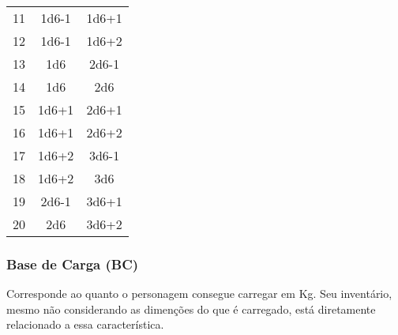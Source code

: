 \documentclass[a4paper]{article}
\begin{document}
\begin{table}[h]
{\begin{tabular}{ l l l }
    \multicolumn{1}{|c|}{11 \centering } &
    \multicolumn{1}{c|}{1d6-1 \centering } &
    \multicolumn{1}{c|}{1d6+1 \centering }
  \\  
  \cline{1-1}\cline{2-2}\cline{3-3}  
    \multicolumn{1}{|c|}{12 \centering } &
    \multicolumn{1}{c|}{1d6-1 \centering } &
    \multicolumn{1}{c|}{1d6+2 \centering }
  \\  
  \cline{1-1}\cline{2-2}\cline{3-3}  
    \multicolumn{1}{|c|}{13 \centering } &
    \multicolumn{1}{c|}{1d6 \centering } &
    \multicolumn{1}{c|}{2d6-1 \centering }
  \\  
  \cline{1-1}\cline{2-2}\cline{3-3}  
    \multicolumn{1}{|c|}{14 \centering } &
    \multicolumn{1}{c|}{1d6 \centering } &
    \multicolumn{1}{c|}{2d6 \centering }
  \\  
  \cline{1-1}\cline{2-2}\cline{3-3}  
    \multicolumn{1}{|c|}{15 \centering } &
    \multicolumn{1}{c|}{1d6+1 \centering } &
    \multicolumn{1}{c|}{2d6+1 \centering }
  \\  
  \cline{1-1}\cline{2-2}\cline{3-3}  
    \multicolumn{1}{|c|}{16 \centering } &
    \multicolumn{1}{c|}{1d6+1 \centering } &
    \multicolumn{1}{c|}{2d6+2 \centering }
  \\  
  \cline{1-1}\cline{2-2}\cline{3-3}  
    \multicolumn{1}{|c|}{17 \centering } &
    \multicolumn{1}{c|}{1d6+2 \centering } &
    \multicolumn{1}{c|}{3d6-1 \centering }
  \\  
  \cline{1-1}\cline{2-2}\cline{3-3}  
    \multicolumn{1}{|c|}{18 \centering } &
    \multicolumn{1}{c|}{1d6+2 \centering } &
    \multicolumn{1}{c|}{3d6 \centering }
  \\  
  \cline{1-1}\cline{2-2}\cline{3-3}  
    \multicolumn{1}{|c|}{19 \centering } &
    \multicolumn{1}{c|}{2d6-1 \centering } &
    \multicolumn{1}{c|}{3d6+1 \centering }
  \\  
  \cline{1-1}\cline{2-2}\cline{3-3}  
    \multicolumn{1}{|c|}{20 \centering } &
    \multicolumn{1}{c|}{2d6 \centering } &
    \multicolumn{1}{c|}{3d6+2 \centering }
  \\  
  \hline

 \end{tabular} }
\end{table}

\subsubsection{Base de Carga (BC)}

Corresponde ao quanto o personagem consegue carregar em Kg. Seu inventário, mesmo não considerando as dimenções do que é carregado, está diretamente relacionado a essa característica. 
\end{document}

